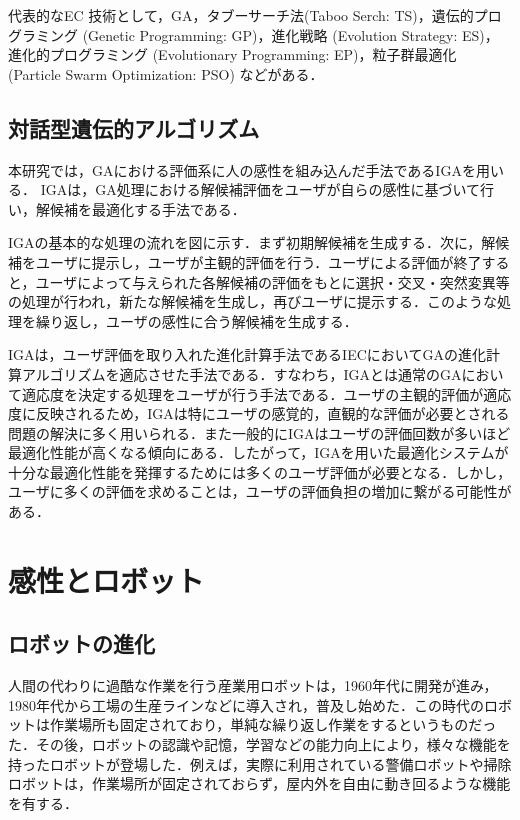 代表的なEC 技術として，GA，タブーサーチ法(Taboo Serch: TS)，遺伝的プログラミング (Genetic Programming: GP)，進化戦略 (Evolution Strategy: ES)，進化的プログラミング (Evolutionary Programming: EP)，粒子群最適化 (Particle Swarm Optimization: PSO) などがある．
    
\subsection{対話型遺伝的アルゴリズム}
\label{sec2.2.2}

本研究では，GAにおける評価系に人の感性を組み込んだ手法であるIGAを用いる．
IGAは，GA処理における解候補評価をユーザが自らの感性に基づいて行い，解候補を最適化する手法である．

IGAの基本的な処理の流れを図に示す．まず初期解候補を生成する．次に，解候補をユーザに提示し，ユーザが主観的評価を行う．ユーザによる評価が終了すると，ユーザによって与えられた各解候補の評価をもとに選択・交叉・突然変異等の処理が行われ，新たな解候補を生成し，再びユーザに提示する．このような処理を繰り返し，ユーザの感性に合う解候補を生成する．

IGAは，ユーザ評価を取り入れた進化計算手法であるIECにおいてGAの進化計算アルゴリズムを適応させた手法である．すなわち，IGAとは通常のGAにおいて適応度を決定する処理をユーザが行う手法である．ユーザの主観的評価が適応度に反映されるため，IGAは特にユーザの感覚的，直観的な評価が必要とされる問題の解決に多く用いられる．また一般的にIGAはユーザの評価回数が多いほど最適化性能が高くなる傾向にある．したがって，IGAを用いた最適化システムが十分な最適化性能を発揮するためには多くのユーザ評価が必要となる．しかし，ユーザに多くの評価を求めることは，ユーザの評価負担の増加に繋がる可能性がある．



\newpage

\section{感性とロボット}
\label{sec2.3}

\subsection{ロボットの進化}
\label{sec2.3.1}

人間の代わりに過酷な作業を行う産業用ロボットは，1960年代に開発が進み，1980年代から工場の生産ラインなどに導入され，普及し始めた．この時代のロボットは作業場所も固定されており，単純な繰り返し作業をするというものだった．その後，ロボットの認識や記憶，学習などの能力向上により，様々な機能を持ったロボットが登場した．例えば，実際に利用されている警備ロボットや掃除ロボットは，作業場所が固定されておらず，屋内外を自由に動き回るような機能を有する．

